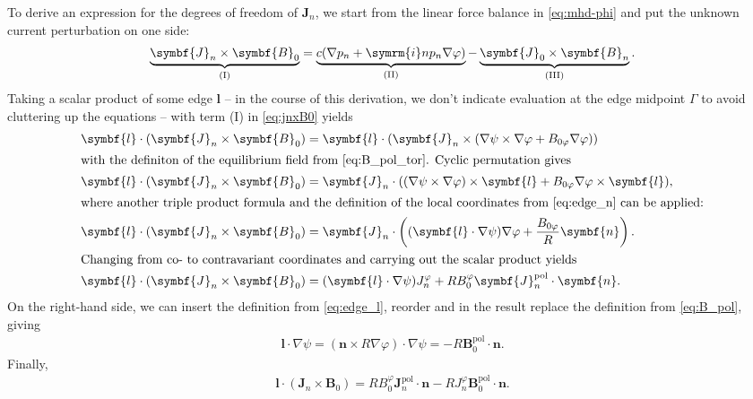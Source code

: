 \documentclass[a4paper, twoside, 10pt, english]{article}
\numberwithin{equation}{section}
\let\temp\varrho
\let\varrho\rho
\let\rho\temp
\let\temp\vartheta
\let\vartheta\theta
\let\theta\temp
\let\temp\varphi
\let\varphi\phi
\let\phi\temp
\let\vec\symbf
\newcommand*\grad{\ensuremath{\nabla}}
\newcommand*\im{\ensuremath{\symrm{i}}}  %
\newcommand*\pol{\ensuremath{\textrm{pol}}}  %
\begin{document}
To derive an expression for the degrees of freedom of $\vec{J}_{n}$, we start from the linear force balance in \cref{eq:mhd-phi} and put the unknown current perturbation on one side:
\begin{gather}
  \underbrace{\vec{J}_{n} \times \vec{B}_{0}}_{\text{(I)}} = \underbrace{c (\grad p_{n} + \im n p_{n} \grad \phi)}_{\text{(II)}} - \underbrace{\vec{J}_{0} \times \vec{B}_{n}}_{\text{(III)}}. \label{eq:jnxB0}
\end{gather}
Taking a scalar product of some edge $\vec{l}$ -- in the course of this derivation, we don't indicate evaluation at the edge midpoint $\Gamma$ to avoid cluttering up the equations -- with term (I) in \cref{eq:jnxB0} yields
\begin{align}
  \vec{l} \cdot (\vec{J}_{n} \times \vec{B}_{0}) &= \vec{l} \cdot (\vec{J}_{n} \times (\grad \psi \times \grad \phi + B_{0 \phi} \grad \phi)) \\
  \intertext{with the definiton of the equilibrium field from \cref{eq:B_pol_tor}. Cyclic permutation gives}
  \vec{l} \cdot (\vec{J}_{n} \times \vec{B}_{0}) &= \vec{J}_{n} \cdot ((\grad \psi \times \grad \phi) \times \vec{l} + B_{0 \phi} \grad \phi \times \vec{l}), \\
  \intertext{where another triple product formula and the definition of the local coordinates from \cref{eq:edge_n} can be applied:}
  \vec{l} \cdot (\vec{J}_{n} \times \vec{B}_{0}) &= \vec{J}_{n} \cdot \left ( (\vec{l} \cdot \grad \psi) \grad \phi + \frac{B_{0 \phi}}{R} \vec{n} \right ). \\
  \intertext{Changing from co- to contravariant coordinates and carrying out the scalar product yields}
  \vec{l} \cdot (\vec{J}_{n} \times \vec{B}_{0}) &= (\vec{l} \cdot \grad \psi) J_{n}^{\phi} + R B_{0}^{\phi} \vec{J}_{n}^{\pol} \cdot \vec{n}.
\end{align}
On the right-hand side, we can insert the definition from \cref{eq:edge_l}, reorder and in the result replace the definition from \cref{eq:B_pol}, giving
\begin{gather}
  \vec{l} \cdot \grad \psi = \left( \vec{n} \times R \grad \phi \right) \cdot \grad \psi = -R \vec{B}_{0}^{\pol} \cdot \vec{n}. \label{eq:l_grad_psi}
\end{gather}
Finally,
\begin{gather}
  \vec{l} \cdot (\vec{J}_{n} \times \vec{B}_{0}) = R B_{0}^{\phi} \vec{J}_{n}^{\pol} \cdot \vec{n} - R J_{n}^{\phi} \vec{B}_{0}^{\pol} \cdot \vec{n}. \label{eq:jnxB0_I}
\end{gather}
\end{document}
